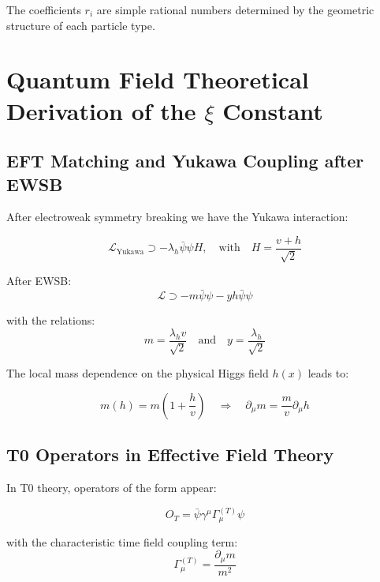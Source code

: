 \documentclass[12pt,a4paper]{article}
\begin{document}
	The coefficients $r_i$ are simple rational numbers determined by the geometric structure of each particle type.
	
	\section{Quantum Field Theoretical Derivation of the $\xi$ Constant}
	\label{sec:qft_derivation}
	
	\subsection{EFT Matching and Yukawa Coupling after EWSB}
	\label{subsec:eft_matching}
	
	After electroweak symmetry breaking we have the Yukawa interaction:
	
	\begin{equation}
		\mathcal{L}_{\text{Yukawa}} \supset -\lambda_h \bar{\psi}\psi H, \quad \text{with} \quad H = \frac{v + h}{\sqrt{2}}
	\end{equation}
	
	After EWSB:
	\begin{equation}
		\mathcal{L} \supset -m \bar{\psi}\psi - y h \bar{\psi}\psi
	\end{equation}
	
	with the relations:
	\begin{equation}
		m = \frac{\lambda_h v}{\sqrt{2}} \quad \text{and} \quad y = \frac{\lambda_h}{\sqrt{2}}
	\end{equation}
	
	The local mass dependence on the physical Higgs field $h(x)$ leads to:
	
	\begin{equation}
		m(h) = m\left(1 + \frac{h}{v}\right) \quad \Rightarrow \quad \partial_\mu m = \frac{m}{v}\partial_\mu h
	\end{equation}
	
	\subsection{T0 Operators in Effective Field Theory}
	\label{subsec:t0_operators}
	
	In T0 theory, operators of the form appear:
	
	\begin{equation}
		O_T = \bar{\psi}\gamma^\mu\Gamma_\mu^{(T)}\psi
	\end{equation}
	
	with the characteristic time field coupling term:
	\begin{equation}
		\Gamma_\mu^{(T)} = \frac{\partial_\mu m}{m^2}
	\end{equation}
	
\end{document}
